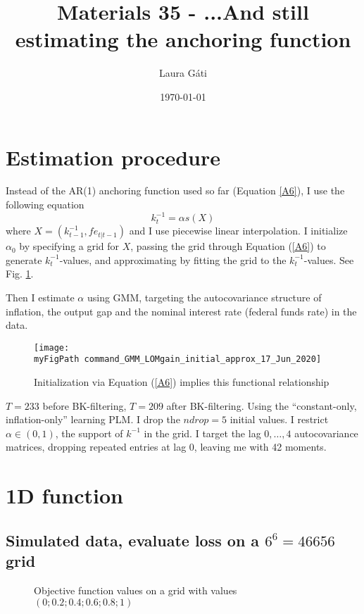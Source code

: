 \documentclass[11pt]{article}
\def \myFigPath {../../figures/}
\renewcommand{\[}{\begin{equation}}
\renewcommand{\]}{\end{equation}}
\def\mySmallFigScale{0.22}
\def\myTinyFigScale{0.16}
\begin{document}
\linespread{1.0}

\title{Materials 35 - ...And still estimating the anchoring function}
\author{Laura G\'ati} 
\date{\today}
\maketitle


\tableofcontents


\newpage
\section{Estimation procedure}
Instead of the AR(1) anchoring function used so far (Equation \ref{A6}), I use the following equation
\begin{equation}
k_t^{-1} = \alpha s(X)
\end{equation}
where $X = (k^{-1}_{t-1}, fe_{t|t-1})$ and I use piecewise linear interpolation. I initialize $\alpha_0$ by specifying a grid for $X$, passing the grid through Equation (\ref{A6}) to generate $k^{-1}_t$-values, and approximating by fitting the grid to the $k^{-1}_t$-values.  See Fig. \ref{fig_initial_anchor_fct}.

Then I estimate $\alpha$ using GMM, targeting the autocovariance structure of inflation, the output gap and the nominal interest rate (federal funds rate) in the data. 

\begin{figure}[h!]
\texttt{[image: \\myFigPath command\_GMM\_LOMgain\_initial\_approx\_17\_Jun\_2020]}
\caption{Initialization via Equation (\ref{A6}) implies this functional relationship}
\label{fig_initial_anchor_fct}
\end{figure}

$T=233$ before BK-filtering, $T=209$ after BK-filtering. Using the ``constant-only, inflation-only'' learning PLM. I drop the $ndrop=5$ initial values. I restrict $\alpha \in (0,1)$, the support of $k^{-1}$ in the grid. I target the lag $0,\dots,4$ autocovariance matrices, dropping repeated entries at lag 0, leaving me with 42 moments.

\clearpage
\section{1D function}

\subsection{Simulated data, evaluate loss on a $6^6=46656$ grid}
\begin{figure}[h!]
\hfill
{}
\caption{Objective function values on a grid with values $(0;    0.2;    0.4;    0.6;    0.8;   1)$}
\end{figure}
\end{document}
